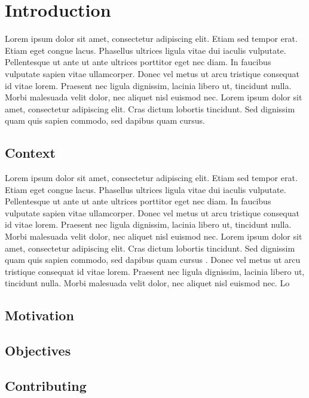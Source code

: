 \chapter{Introduction}

Lorem ipsum dolor sit amet, consectetur adipiscing elit. Etiam sed tempor erat. Etiam eget congue lacus. Phasellus ultrices ligula vitae dui iaculis vulputate. Pellentesque ut ante ut ante ultrices porttitor eget nec diam. In faucibus vulputate sapien vitae ullamcorper. Donec vel metus ut arcu tristique consequat id vitae lorem. Praesent nec ligula dignissim, lacinia libero ut, tincidunt nulla. Morbi malesuada velit dolor, nec aliquet nisl euismod nec. Lorem ipsum dolor sit amet, consectetur adipiscing elit. Cras dictum lobortis tincidunt. Sed dignissim quam quis sapien commodo, sed dapibus quam cursus.

\section{Context}

Lorem ipsum dolor sit amet, consectetur adipiscing elit. Etiam sed tempor erat. Etiam eget congue lacus. Phasellus ultrices ligula vitae dui iaculis vulputate. Pellentesque ut ante ut ante ultrices porttitor eget nec diam. In faucibus vulputate sapien vitae ullamcorper. Donec vel metus ut arcu tristique consequat id vitae lorem. Praesent nec ligula dignissim, lacinia libero ut, tincidunt nulla. Morbi malesuada velit dolor, nec aliquet nisl euismod nec. Lorem ipsum dolor sit amet, consectetur adipiscing elit. Cras dictum lobortis tincidunt. Sed dignissim quam quis sapien commodo, sed dapibus quam cursus \citep{le-etal-2025-overview}. Donec vel metus ut arcu tristique consequat id vitae lorem. Praesent nec ligula dignissim, lacinia libero ut, tincidunt nulla. Morbi malesuada velit dolor, nec aliquet nisl euismod nec. Lo

\section{Motivation}

\section{Objectives}

\section{Contributing}


